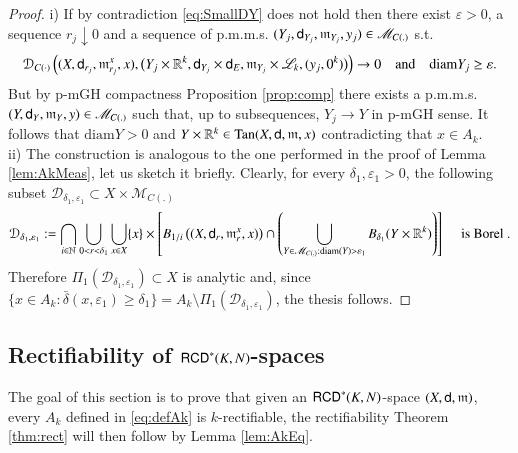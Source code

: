\documentclass[11pt,reqno]{amsart}
\newcommand{\MM}{\mathscr{M}}
\newcommand{\diam}{\text{diam}}
\newcommand{\mm}{\mathfrak m}
\newcommand{\sfd}{{\sf d}}
\newcommand{\LL}{\mathscr{L}}
\newcommand{\R}{\mathbb{R}}
\newcommand{\N}{\mathbb{N}}
\newcommand{\Tan}{{\rm Tan}}
\newcommand{\RCD}{{\sf RCD}}
\newcommand{\vare}{\varepsilon}
\theoremstyle{definition}
\theoremstyle{remark}
\theoremstyle{remark}
\theoremstyle{remark}
\theoremstyle{remark}
\theoremstyle{remark}
\theoremstyle{remark}
\theoremstyle{remark}
\begin{document}
\begin{proof}
i) If by contradiction \eqref{eq:SmallDY} does not hold then there exist $\vare>0$, a sequence $r_j\downarrow 0$ and a sequence of p.m.m.s. $(Y_j,\sfd_{Y_j}, \mm_{Y_j}, y_j)\in \MM_{C(.)}$ s.t. 
$$\mathcal D_{C(\cdot)} \left((X,\sfd_{r_j}, \mm^x_{r_j},x), \big(Y_j\times \R^k, \sfd_{Y_j}\times \sfd_E, \mm_{Y_j} \times \LL_k, (y_j,0^k) \big) \right) \to 0  \quad \text{and} \quad  \diam{Y_j}\geq \vare. $$
But by p-mGH compactness Proposition \ref{prop:comp} there exists a p.m.m.s.  $(Y,\sfd_{Y}, \mm_{Y}, y)\in \MM_{C(.)}$ such that, up to subsequences,  $Y_j\to Y$ in p-mGH sense. It follows that $\diam Y>0$ and $Y\times \R^k \in \Tan(X,\sfd,\mm,x)$ contradicting that $x \in A_k$.
\\

ii) The construction is analogous to the one performed in the proof of Lemma \ref{lem:AkMeas}, let us sketch it briefly. Clearly, for every $\delta_1, \vare_1>0$, the following subset ${\mathcal D}_{\delta_1, \vare_1}\subset X\times \MM_{C(.)}$
$${\mathcal D}_{\delta_1, \vare_1}:=\bigcap_{i \in \N} \bigcup_{0<r<\delta_1} \bigcup_{x \in X} \{x\}\times \left[B_{1/i}\left((X,\sfd_r, \mm^x_r, x)\right)  \cap \left( \bigcup_{Y\in \MM_{C(.)}:\diam(Y)> \vare_1} B_{\delta_1} (Y\times \R^k) \right)  \right] \quad \text{ is Borel }. $$
Therefore $\Pi_1({\mathcal D}_{\delta_1, \vare_1})\subset X$ is analytic and, since $\{x \in A_k:\bar{\delta}(x, \vare_1)\geq \delta_1\}=A_k\setminus \Pi_1({\mathcal D}_{\delta_1, \vare_1})$, the thesis follows.
\end{proof}


\subsection{Rectifiability of $\RCD^*(K,N)$-spaces}\label{SS:Rect}
The goal of this section is to prove that given an $\RCD^*(K,N)$-space $(X,\sfd,\mm)$, every $A_k$ defined in \eqref{eq:defAk} is $k$-rectifiable, the rectifiability Theorem \ref{thm:rect} will then  follow by Lemma \ref{lem:AkEq}.
\end{document}
